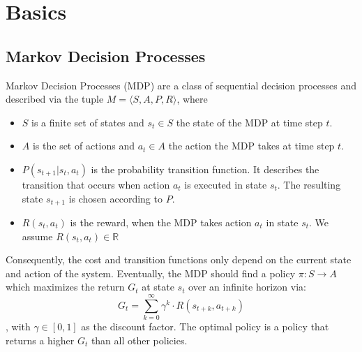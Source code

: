 \section{Basics}
\label{Basics}

\subsection{Markov Decision Processes}
\label{mdp}

Markov Decision Processes (MDP) \cite{gabor19, puterman94} are a class of sequential decision processes and described via the tuple $M = \langle S, A, P, R \rangle$, where
\begin{description}
   \begin{itemize}
        \item $S$ is a finite set of states and $s_t \in S$ the state of the MDP at time step $t$. 
        \item $A$ is the set of actions and $a_t \in A$ the action the MDP takes at time step $t$.
        \item $P(s_{t+1}|s_t,a_t)$ is the probability transition function. It describes the transition that occurs when action $a_t$ is executed in state $s_t$. The resulting state $s_{t+1}$ is chosen according to $P$.
        \item $R(s_t,a_t)$ is the reward, when the MDP takes action $a_t$ in state $s_t$. We assume $R(s_t,a_t) \in \mathbb{R}$
   \end{itemize}
\end{description}
Consequently, the cost and transition functions only depend on the current state and action of the system. Eventually, the MDP should find a policy $\pi : S \rightarrow A$ which maximizes the return $G_t$ at state $s_t$ over an infinite horizon via:
\begin{equation}
    G_t = \sum_{k=0}^\infty \gamma^k \cdot R(s_{t+k}, a_{t+k})
\end{equation}
, with $\gamma \in [0,1]$ as the discount factor. The optimal policy is a policy that returns a higher $G_t$ than all other policies.


